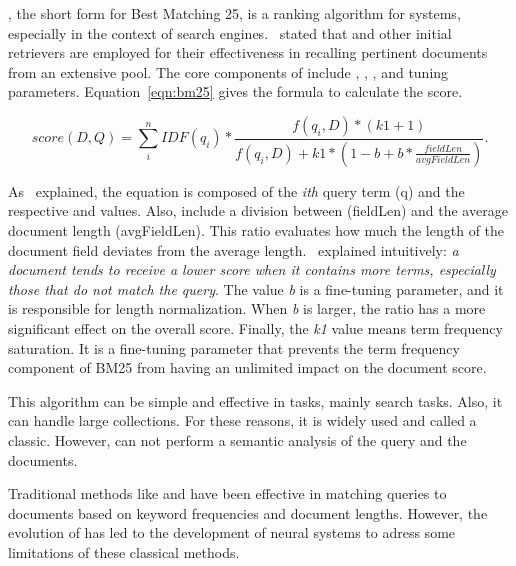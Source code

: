 {\bm}, the short form for Best Matching 25, is a ranking algorithm for {\ir} systems, especially in the context of search engines.~\citet{hambarde_information_2023} stated that {\bm} and other initial retrievers are employed for their effectiveness in recalling pertinent documents from an extensive pool. The core components of {\bm} include {\tf}, {\idf}, {\dl}, and tuning parameters. Equation~\ref{eqn:bm25} gives the formula to calculate the {\bm} score.

\begin{equation}
score(D,Q) = \sum_{i}^{n} IDF(q_{i}) \ast \frac{f(q_{i},D) \ast (k1 + 1)}{f(q_{i},D) + k1 \ast (1 - b + b \ast \frac{fieldLen}{avgFieldLen})}.
\label{eqn:bm25}
\end{equation}

As~\citet{phd_understanding_2023} explained, the {\bm} equation is composed of the \textit{ith} query term (q) and the respective {\idf} and {\tf} values. Also, include a division between {\dl} (fieldLen) and the average document length (avgFieldLen). This ratio evaluates how much the length of the document field deviates from the average length.~\citet{noauthor_practical_2018} explained intuitively: \textit{a document tends to receive a lower score when it contains more terms, especially those that do not match the query}. The value \textit{b} is a fine-tuning parameter, and it is responsible for length normalization. When \textit{b} is larger, the ratio has a more significant effect on the overall score. Finally, the \textit{k1} value means term frequency saturation. It is a fine-tuning parameter that prevents the term frequency component of BM25 from having an unlimited impact on the document score.

This algorithm can be simple and effective in {\ir} tasks, mainly search tasks. Also, it can handle large collections. For these reasons, it is widely used and called a classic. However, {\bm} can not perform a semantic analysis of the query and the documents.



Traditional {\ir} methods like {\tfidf} and {\bm} have been effective in matching queries to documents based on keyword frequencies and document lengths. However, the evolution of {\ai} has led to the development of neural {\ir} systems to adress some limitations of these classical methods.



